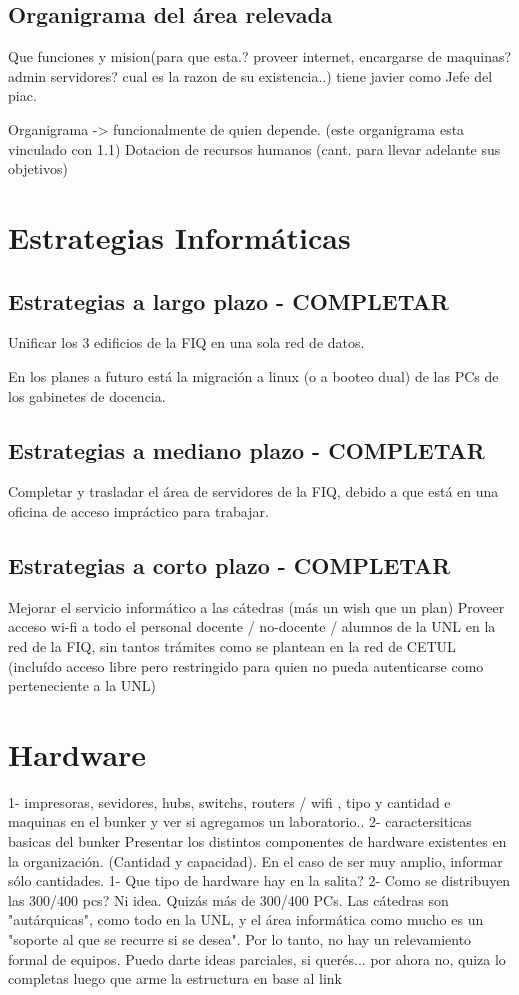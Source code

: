 \documentclass[10pt,a4paper,final]{article}
\begin{document}
\subsection{Organigrama del área relevada}
Que funciones y  mision(para que esta.? proveer internet, encargarse de maquinas? admin servidores? cual es la razon de su existencia..) tiene javier como Jefe del piac.

    Organigrama -> funcionalmente de quien depende. (este organigrama esta vinculado con 1.1)
          Dotacion de recursos humanos (cant. para llevar adelante sus objetivos)
\section{Estrategias Informáticas}
\subsection{Estrategias a largo plazo - COMPLETAR}
Unificar los 3 edificios de la FIQ en una sola red de datos.

En los planes a futuro está la migración a linux (o a booteo dual) de las PCs de los gabinetes de docencia.
\subsection{Estrategias a mediano plazo - COMPLETAR}
Completar y trasladar el área de servidores de la FIQ, debido a que está en una oficina de acceso impráctico para trabajar.
\subsection{Estrategias a corto plazo - COMPLETAR}
Mejorar el servicio informático a las cátedras (más un wish que un plan)
Proveer acceso wi-fi a todo el personal docente / no-docente / alumnos de la UNL en la red de la FIQ, sin tantos trámites como se plantean en la red de CETUL (incluído acceso libre pero restringido para quien no pueda autenticarse como perteneciente a la UNL)

\section{Hardware}
1- impresoras, sevidores, hubs, switchs, routers / wifi , tipo y cantidad e maquinas en el bunker y ver si agregamos un laboratorio..
2- caractersiticas basicas del bunker
Presentar los distintos componentes de hardware existentes en la organización. (Cantidad y capacidad).
En el caso de ser muy amplio, informar sólo cantidades.
1- Que tipo de hardware hay en la salita?
2- Como se distribuyen las 300/400 pcs?
Ni idea. Quizás más de 300/400 PCs. Las cátedras son "autárquicas", como todo en la UNL, y el área informática como mucho es un "soporte al que se recurre si se desea". Por lo tanto, no hay un relevamiento formal de equipos.
Puedo darte ideas parciales, si querés...
por ahora no, quiza lo completas luego que arme la estructura en base al link
\end{document}
